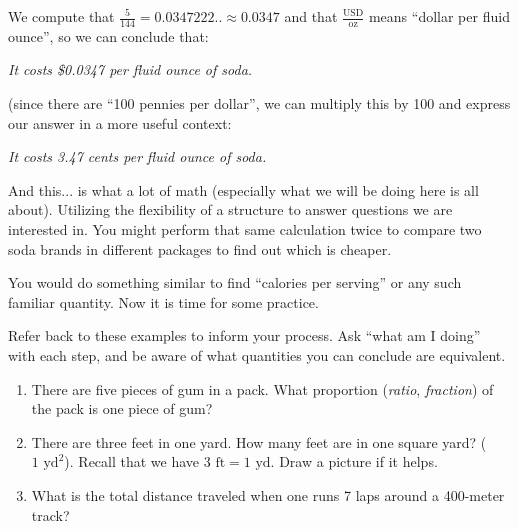\documentclass[12pt]{article}
\begin{document}
We compute that $\frac{5}{144} = 0.0347222.. \approx 0.0347$ and that $\frac{\text{USD}}{\text{oz}}$ means ``dollar per fluid ounce'', so we can conclude that:
\begin{center}
\emph{It costs \$0.0347 per fluid ounce of soda. }
\end{center}
(since there are ``100 pennies per dollar'', we can multiply this by 100 and express our answer in a more useful context:
\begin{center}
\emph{It costs 3.47 cents per fluid ounce of soda. }
\end{center}

And this... is what a lot of math (especially what we will be doing here is all about). 
Utilizing the flexibility of a structure to answer questions we are interested in. 
You might perform that same calculation twice to compare two soda brands in different packages to find out which is cheaper. 

You would do something similar to find ``calories per serving'' or any such familiar quantity.
Now it is time for some practice.

Refer back to these examples to inform your process. 
Ask ``what am I doing'' with each step, and be aware of what quantities you can conclude are equivalent.
\pagebreak


\begin{enumerate}
\item There are five pieces of gum in a pack. What proportion (\emph{ratio}, \emph{fraction}) of the pack is one piece of gum?
\vspace{0.5in}

\item There are three feet in one yard. 
How many feet are in one square yard?
($1 \text{ yd}^2$). Recall that we have $3\text{ ft} = 1\text{ yd}$. Draw a picture if it helps.
\vspace{1in}

\item What is the total distance traveled when one runs 7 laps around a 400-meter track?
\vspace{0.5in}

\end{enumerate}

\end{document}
